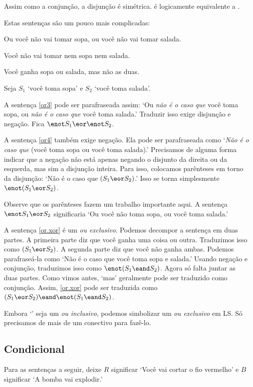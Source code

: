 Assim como a conjunção, a disjunção é simétrica. \eor{} é logicamente equivalente a \eor{}.

Estas sentenças são um pouco mais complicadas:

\begin{earg}
\item[\ex{or3}] Ou você não vai tomar sopa, ou você não vai tomar salada.
\item[\ex{or4}] Você não vai tomar nem sopa nem salada.
\item[\ex{or.xor}] Você ganha sopa ou salada, mas não as duas.
\end{earg}

Seja $S_1$ `você toma sopa' e $S_2$ `você toma salada'.

A sentença \ref{or3} pode ser parafraseada assim: `Ou \emph{não é o caso que} você toma sopa, ou \emph{não é o caso que} você toma salada.' Traduzir isso exige disjunção e negação. Fica $\enot S_1 \eor \enot S_2$.

A sentença \ref{or4} também exige negação. Ela pode ser parafraseada como `\emph{Não é o caso que} (você toma sopa ou você toma salada).' Precisamos de alguma forma indicar que a negação não está apenas negando o disjunto da direita ou da esquerda, mas sim a disjunção inteira. Para isso, colocamos parênteses em torno da disjunção: `Não é o caso que $(S_1 \eor S_2)$.' Isso se torna simplesmente $\enot (S_1 \eor S_2)$.

Observe que os parênteses fazem um trabalho importante aqui. A sentença $\enot S_1 \eor S_2$ significaria `Ou você não toma sopa, ou você toma salada.'

A sentença \ref{or.xor} é um \emph{ou exclusivo}. Podemos decompor a sentença em duas partes. A primeira parte diz que você ganha uma coisa ou outra. Traduzimos isso como $(S_1 \eor S_2)$. A segunda parte diz que você não ganha ambas. Podemos parafraseá-la como `Não é o caso que você toma sopa e salada.' Usando negação e conjunção, traduzimos isso como $\enot(S_1 \eand S_2)$. Agora só falta juntar as duas partes. Como vimos antes, `mas' geralmente pode ser traduzido como conjunção. Assim, \ref{or.xor} pode ser traduzida como $(S_1 \eor S_2) \eand \enot(S_1 \eand S_2)$.

Embora `\eor' seja um \emph{ou inclusivo}, podemos simbolizar um \emph{ou exclusivo} em {LS}. Só precisamos de mais de um conectivo para fazê-lo.


\subsection{Condicional}
Para as sentenças a seguir, deixe $R$ significar `Você vai cortar o fio vermelho' e $B$ significar `A bomba vai explodir.'

